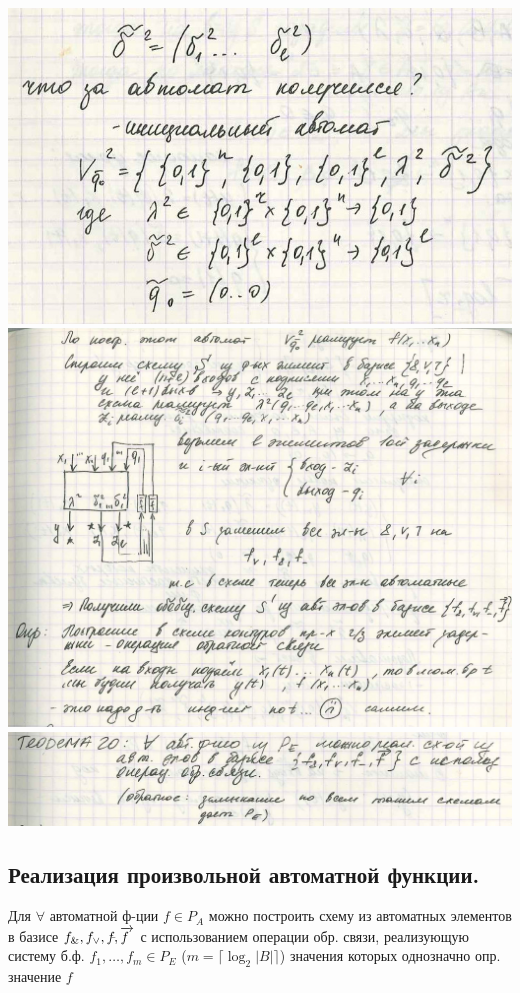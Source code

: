 \documentclass[12pt]{article}
\begin{document}
	\includegraphics[width=450pt]{48}\\
	\includegraphics[width=450pt]{49}\\
	\includegraphics[width=450pt]{50}
\subsection{Реализация произвольной автоматной функции.}
	Для $\forall$ автоматной ф-ции $f \in P_A$ можно построить схему из автоматных элементов в базисе ${f_{\&}, f_{\vee}, f_{\bar{}}, \overrightarrow{\mkern -3mu f\mkern 3mu}}$ с использованием операции обр. связи, реализующую систему б.ф. $f_1,\dotsc,f_m \in P_E$ ($m = \lceil \log_2|B| \rceil$) значения которых однозначно опр. значение $f$
\end{document}
